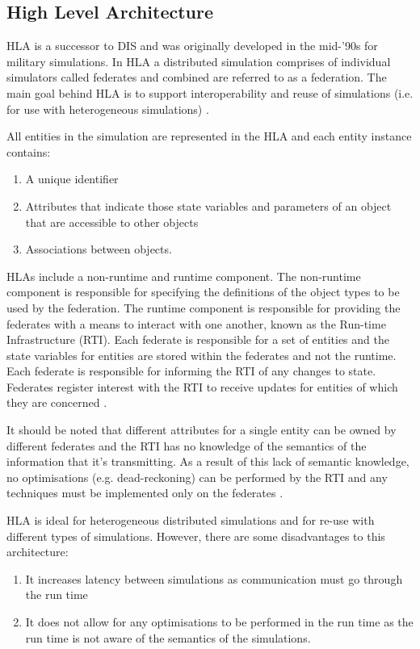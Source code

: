 \subsection{High Level Architecture}
HLA is a successor to DIS and was originally developed in the mid-'90s for military simulations. In HLA a distributed simulation comprises of individual simulators called federates and combined are referred to as a federation. The main goal behind HLA is to support interoperability and reuse of simulations (i.e. for use with heterogeneous simulations) \cite{fujimoto2000parallel}.

All entities in the simulation are represented in the HLA and each entity instance contains:
\begin{enumerate}
	\item A unique identifier
	\item Attributes that indicate those state variables and parameters of an object that are accessible to other objects
	\item Associations between objects.
\end{enumerate}
HLAs include a non-runtime and runtime component. The non-runtime component is responsible for specifying the definitions of the object types to be used by the federation. The runtime component is responsible for providing the federates with a means to interact with one another, known as the Run-time Infrastructure (RTI). Each federate is responsible for a set of entities and the state variables for entities are stored within the federates and not the runtime. Each federate is responsible for informing the RTI of any changes to state. Federates register interest with the RTI to receive updates for entities of which they are concerned \cite{fujimoto2000parallel}.

It should be noted that different attributes for a single entity can be owned by different federates and the RTI has no knowledge of the semantics of the information that it's transmitting. As a result of this lack of semantic knowledge, no optimisations (e.g. dead-reckoning) can be performed by the RTI and any techniques must be implemented only on the federates \cite{fujimoto2000parallel}.

HLA is ideal for heterogeneous distributed simulations and for re-use with different types of simulations. However, there are some disadvantages to this architecture:
\begin{enumerate}
	\item It increases latency between simulations as communication must go through the run time \item It does not allow for any optimisations to be performed in the run time as the run time is not aware of the semantics of the simulations.
\end{enumerate}

